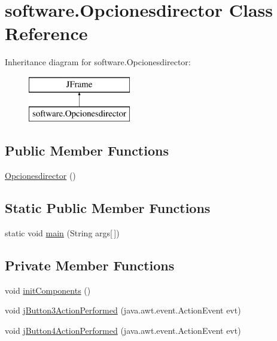 \hypertarget{classsoftware_1_1_opcionesdirector}{}\section{software.\+Opcionesdirector Class Reference}
\label{classsoftware_1_1_opcionesdirector}
Inheritance diagram for software.\+Opcionesdirector\+:\begin{figure}[H]
\begin{center}
\leavevmode
\includegraphics[height=2.000000cm]{classsoftware_1_1_opcionesdirector}
\end{center}
\end{figure}
\subsection*{Public Member Functions}
\begin{DoxyCompactItemize}
\item 
\mbox{\hyperlink{classsoftware_1_1_opcionesdirector_ab03556d9e7d710b395c16d98ab24896c}{Opcionesdirector}} ()
\end{DoxyCompactItemize}
\subsection*{Static Public Member Functions}
\begin{DoxyCompactItemize}
\item 
static void \mbox{\hyperlink{classsoftware_1_1_opcionesdirector_a814f46860f6fb87336bd6626ceb23c1a}{main}} (String args\mbox{[}$\,$\mbox{]})
\end{DoxyCompactItemize}
\subsection*{Private Member Functions}
\begin{DoxyCompactItemize}
\item 
void \mbox{\hyperlink{classsoftware_1_1_opcionesdirector_a239678bf3bce1d21459f8bae45749600}{init\+Components}} ()
\item 
void \mbox{\hyperlink{classsoftware_1_1_opcionesdirector_a32bd43410331428c339f5c613239cf58}{j\+Button3\+Action\+Performed}} (java.\+awt.\+event.\+Action\+Event evt)
\item 
void \mbox{\hyperlink{classsoftware_1_1_opcionesdirector_ac54a366add94d48d2b25ed78bfd9dcc4}{j\+Button4\+Action\+Performed}} (java.\+awt.\+event.\+Action\+Event evt)
\end{DoxyCompactItemize}
